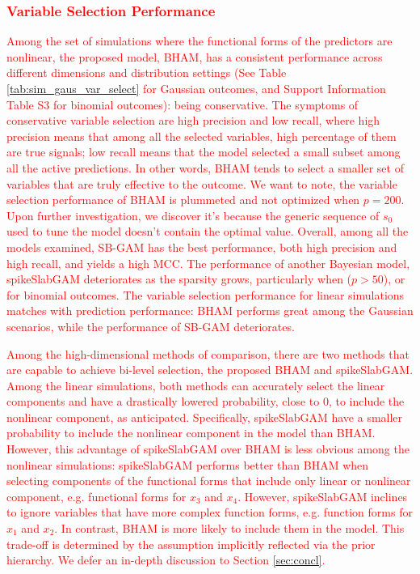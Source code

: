 \documentclass[AMA,STIX1COL,]{WileyNJD-v2}
\begin{document}
\textcolor{red}{\subsubsection{Variable Selection Performance}}
\textcolor{red}{Among the set of simulations where the functional forms of the predictors are nonlinear, the proposed model, BHAM, has a consistent performance across different dimensions and distribution settings (See Table \ref{tab:sim_gaus_var_select} for Gaussian outcomes, and Support Information Table S3 for binomial outcomes): being conservative. The symptoms of conservative variable selection are high precision and low recall, where high precision means that among all the selected variables, high percentage of them are true signals; low recall means that the model selected a small subset among all the active predictions. In other words, BHAM tends to select a smaller set of variables that are truly effective to the outcome. We want to note, the variable selection performance of BHAM is plummeted and not optimized when $p=200$. Upon further investigation, we discover it's because the generic sequence of $s_0$ used to tune the model doesn't contain the optimal value. Overall, among all the models examined, SB-GAM has the best performance, both high precision and high recall, and yields a high MCC. The performance of another Bayesian model, spikeSlabGAM deteriorates as the sparsity grows, particularly when ($p>50$), or for binomial outcomes. The variable selection performance for linear simulations matches with prediction performance: BHAM performs great among the Gaussian scenarios, while the performance of SB-GAM deteriorates.}

\textcolor{red}{Among the high-dimensional methods of comparison, there are two methods that are capable to achieve bi-level selection, the proposed BHAM and spikeSlabGAM. Among the linear simulations, both methods can accurately select the linear components and have a drastically lowered probability, close to 0, to include the nonlinear component, as anticipated. Specifically, spikeSlabGAM have a smaller probability to include the nonlinear component in the model than BHAM. However, this advantage of spikeSlabGAM over BHAM is less obvious among the nonlinear simulations: spikeSlabGAM performs better than BHAM when selecting components of the functional forms that include only linear or nonlinear component, e.g. functional forms for $x_3$ and $x_4$. However, spikeSlabGAM inclines to ignore variables that have more complex function forms, e.g. function forms for $x_1$ and $x_2$. In contrast, BHAM is more likely to include them in the model. This trade-off is determined by the assumption implicitly reflected via the prior hierarchy. We defer an in-depth discussion to Section \ref{sec:concl}.}
\end{document}
